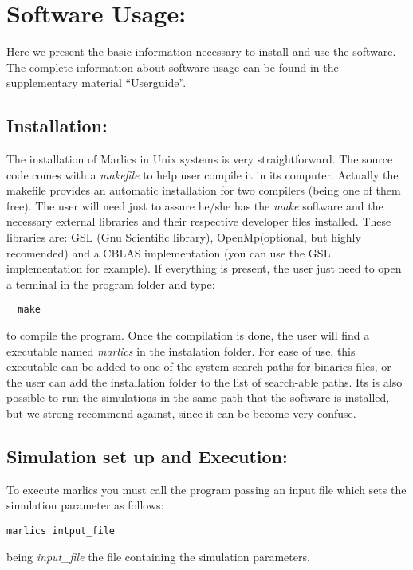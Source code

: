 \documentclass[final,5p,times,twocolumn]{elsarticle}
\begin{document}
\section{Software Usage:} \label{sec:software_usage}

Here we present the basic information necessary to install and use the
software. The complete information about software usage can be found
in the supplementary material ``Userguide''.

\subsection{Installation:}

The installation of Marlics in Unix systems is very
straightforward. The source code comes with a \textit{makefile} to
help user compile it in its computer. Actually the makefile provides
an automatic installation for two compilers (being one of them free).
The user will need just to assure he/she has the \textit{make}
software and the necessary external libraries and their respective
developer files installed. These libraries are: GSL (Gnu Scientific
library), OpenMp(optional, but highly recomended) and a CBLAS
implementation (you can use the GSL implementation for example). If
everything is present, the user just need to open a terminal in the
program folder and type:
\begin{lstlisting}
  make
\end{lstlisting}
to compile the program. Once the compilation is done, the user will
find a executable named \textit{marlics} in the instalation
folder. For ease of use, this executable can be added to one of the
system search paths for binaries files, or the user can add the
installation folder to the list of search-able paths. Its is also
possible to run the simulations in the same path that the software is
installed, but we strong recommend against, since it can be become
very confuse.

\subsection{Simulation set up and Execution:}

To execute marlics you must call the program passing an input file
which sets the simulation parameter as follows:
\begin{lstlisting}
marlics intput_file
\end{lstlisting}
being \textit{input\_file} the file containing the simulation
parameters.
\end{document}
